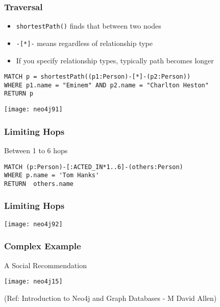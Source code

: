\begin{frame}[fragile]\frametitle{Traversal}

\begin{itemize}
\item \lstinline|shortestPath()| finds that between two nodes
\item \lstinline|-[*]-| means regardless of relationship type
\item If you specify relationship types, typically path becomes longer
\end{itemize}


\begin{lstlisting}
MATCH p = shortestPath((p1:Person)-[*]-(p2:Person))
WHERE p1.name = "Eminem" AND p2.name = "Charlton Heston"
RETURN p

\end{lstlisting}

\begin{center}
\texttt{[image: neo4j91]}
\end{center}	  
\end{frame}


\begin{frame}[fragile]\frametitle{Limiting Hops}

Between 1 to 6 hops


\begin{lstlisting}
MATCH (p:Person)-[:ACTED_IN*1..6]-(others:Person)
WHERE p.name = 'Tom Hanks'
RETURN  others.name
\end{lstlisting}

 
\end{frame}



\begin{frame}[fragile]\frametitle{Limiting Hops}

\begin{center}
\texttt{[image: neo4j92]}
\end{center}	  
\end{frame}



\begin{frame}[fragile]\frametitle{Complex Example}
A Social Recommendation

\begin{center}
\texttt{[image: neo4j15]}
\end{center}	  


{\tiny (Ref: Introduction to Neo4j and Graph Databases
 - M David Allen)}

\end{frame}



